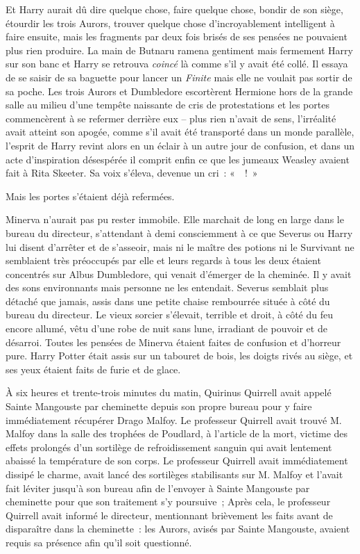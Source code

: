 Et Harry aurait dû dire quelque chose, faire quelque chose, bondir de son siège, étourdir les trois Aurors, trouver quelque chose d'incroyablement intelligent à faire ensuite, mais les fragments par deux fois brisés de ses pensées ne pouvaient plus rien produire.
La main de Butnaru ramena gentiment mais fermement Harry sur son banc et Harry se retrouva \emph{coincé} là comme s'il y avait été collé.
Il essaya de se saisir de sa baguette pour lancer un \emph{Finite} mais elle ne voulait pas sortir de sa poche.
Les trois Aurors et Dumbledore escortèrent Hermione hors de la grande salle au milieu d'une tempête naissante de cris de protestations et les portes commencèrent à se refermer derrière eux -- plus rien n'avait de sens, l'irréalité avait atteint son apogée, comme s'il avait été transporté dans un monde parallèle, l'esprit de Harry revint alors en un éclair à un autre jour de confusion, et dans un acte d'inspiration désespérée il comprit enfin ce que les jumeaux Weasley avaient fait à Rita Skeeter.
Sa voix s'éleva, devenue un cri~: «~~!~»

Mais les portes s'étaient déjà refermées.

\later

Minerva n'aurait pas pu rester immobile.
Elle marchait de long en large dans le bureau du directeur, s'attendant à demi consciemment à ce que Severus ou Harry lui disent d'arrêter et de s'asseoir, mais ni le maître des potions ni le Survivant ne semblaient très préoccupés par elle et leurs regards à tous les deux étaient concentrés sur Albus Dumbledore, qui venait d'émerger de la cheminée.
Il y avait des sons environnants mais personne ne les entendait.
Severus semblait plus détaché que jamais, assis dans une petite chaise rembourrée située à côté du bureau du directeur.
Le vieux sorcier s'élevait, terrible et droit, à côté du feu encore allumé, vêtu d'une robe de nuit sans lune, irradiant de pouvoir et de désarroi.
Toutes les pensées de Minerva étaient faites de confusion et d'horreur pure.
Harry Potter était assis sur un tabouret de bois, les doigts rivés au siège, et ses yeux étaient faits de furie et de glace.

À six heures et trente-trois minutes du matin, Quirinus Quirrell avait appelé Sainte Mangouste par cheminette depuis son propre bureau pour y faire immédiatement récupérer Drago Malfoy.
Le professeur Quirrell avait trouvé M. Malfoy dans la salle des trophées de Poudlard, à l'article de la mort, victime des effets prolongés d'un sortilège de refroidissement sanguin qui avait lentement abaissé la température de son corps.
Le professeur Quirrell avait immédiatement dissipé le charme, avait lancé des sortilèges stabilisants sur M. Malfoy et l'avait fait léviter jusqu'à son bureau afin de l'envoyer à Sainte Mangouste par cheminette pour que son traitement s'y poursuive~; Après cela, le professeur Quirrell avait informé le directeur, mentionnant brièvement les faits avant de disparaître dans la cheminette~: les Aurors, avisés par Sainte Mangouste, avaient requis sa présence afin qu'il soit questionné.

